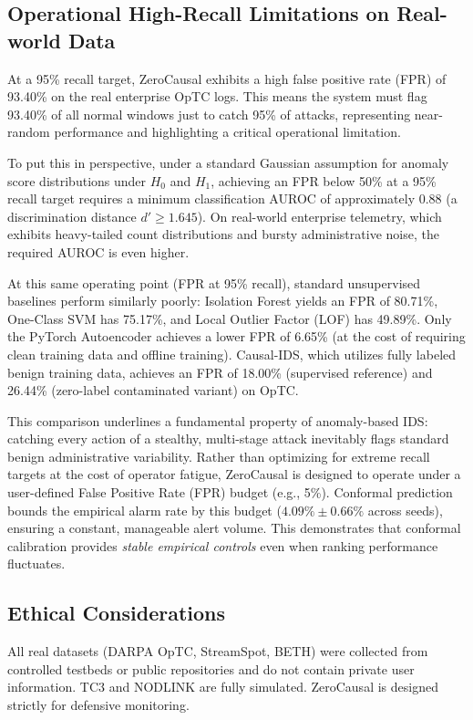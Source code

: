 \subsection{Operational High-Recall Limitations on Real-world Data}
At a 95\% recall target, ZeroCausal exhibits a high false positive rate (FPR) of 93.40\% on the real enterprise OpTC logs. This means the system must flag 93.40\% of all normal windows just to catch 95\% of attacks, representing near-random performance and highlighting a critical operational limitation. 

To put this in perspective, under a standard Gaussian assumption for anomaly score distributions under $H_0$ and $H_1$, achieving an FPR below 50\% at a 95\% recall target requires a minimum classification AUROC of approximately 0.88 (a discrimination distance $d' \ge 1.645$). On real-world enterprise telemetry, which exhibits heavy-tailed count distributions and bursty administrative noise, the required AUROC is even higher. 

At this same operating point (FPR at 95\% recall), standard unsupervised baselines perform similarly poorly: Isolation Forest yields an FPR of 80.71\%, One-Class SVM has 75.17\%, and Local Outlier Factor (LOF) has 49.89\%. Only the PyTorch Autoencoder achieves a lower FPR of 6.65\% (at the cost of requiring clean training data and offline training). Causal-IDS, which utilizes fully labeled benign training data, achieves an FPR of 18.00\% (supervised reference) and 26.44\% (zero-label contaminated variant) on OpTC. 

This comparison underlines a fundamental property of anomaly-based IDS: catching every action of a stealthy, multi-stage attack inevitably flags standard benign administrative variability. Rather than optimizing for extreme recall targets at the cost of operator fatigue, ZeroCausal is designed to operate under a user-defined False Positive Rate (FPR) budget (e.g., 5\%). Conformal prediction bounds the empirical alarm rate by this budget ($4.09\% \pm 0.66\%$ across seeds), ensuring a constant, manageable alert volume. This demonstrates that conformal calibration provides \textit{stable empirical controls} even when ranking performance fluctuates.

\subsection{Ethical Considerations}
All real datasets (DARPA OpTC, StreamSpot, BETH) were collected from controlled testbeds or public repositories and do not contain private user information. TC3 and NODLINK are fully simulated. ZeroCausal is designed strictly for defensive monitoring.
